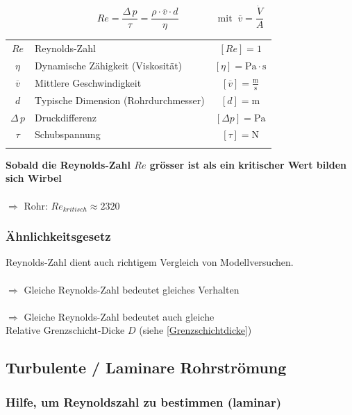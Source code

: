 $$\boxed{  Re = \frac{\Delta \, p}{\tau} = \frac{\rho \cdot \overline{v} \cdot d}{\eta} \qquad \qquad \mathrm{mit} \; \; \overline{v} = \frac{\dot{V}}{A} }  $$

	
\begin{tabular}{c l c}
		$Re$ & Reynolds-Zahl & $[Re] = 1$ \\
		$\eta$ & Dynamische Zähigkeit (Viskosität) & $[\eta] = \mathrm{Pa \cdot s}$  \\
		$\overline{v}$ & Mittlere Geschwindigkeit & $[\overline{v}] = \mathrm{\frac{m}{s}}$ \\
		$d$ & Typische Dimension (Rohrdurchmesser) & $[d] = \mathrm{m}$ \\
		$\Delta \, p$ & Druckdifferenz & $[\Delta p] = \mathrm{Pa}$ \\
		$\tau$ & Schubspannung & $[\tau] = \mathrm{N}$ \\
		\\
\end{tabular}

\textbf{Sobald die Reynolds-Zahl $Re$ grösser ist als ein kritischer Wert bilden sich Wirbel} \\
\\
$\Rightarrow$ Rohr:  $Re_{kritisch} \approx 2320$


\subsubsection{Ähnlichkeitsgesetz}
Reynolds-Zahl dient auch richtigem Vergleich von Modellversuchen. \\
\\
$\Rightarrow$ Gleiche Reynolds-Zahl bedeutet gleiches Verhalten \\
\\
$\Rightarrow$ Gleiche Reynolds-Zahl bedeutet auch gleiche \\
 Relative Grenzschicht-Dicke $D$ (siehe \ref{Grenzschichtdicke})





\subsection{Turbulente / Laminare Rohrströmung}

\subsubsection{Hilfe, um Reynoldszahl zu bestimmen (laminar)}

